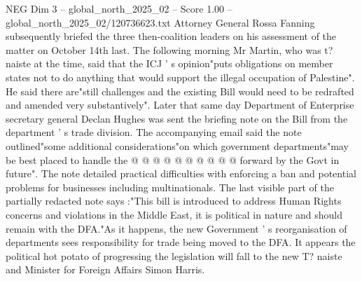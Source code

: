 \begin{textsample}{NEG Dim 3 – global\_north\_2025\_02 – Score 1.00 – global\_north\_2025\_02/120736623.txt}
Attorney General Rossa Fanning subsequently briefed the three then-coalition leaders on his assessment of the matter on October 14th last.
The following morning Mr Martin, who was t? naiste at the time, said that the ICJ ' s opinion"puts obligations on member states not to do anything that would support the illegal occupation of Palestine".
He said there are"still challenges and the existing Bill would need to be redrafted and amended very substantively".
Later that same day Department of Enterprise secretary general Declan Hughes was sent the briefing note on the Bill from the department ' s trade division.
The accompanying email said the note outlined"some additional considerations"on which government departments"may be best placed to handle the @ @ @ @ @ @ @ @ @ @ forward by the Govt in future".
The note detailed practical difficulties with enforcing a ban and potential problems for businesses including multinationals.
The last visible part of the partially redacted note says :"This bill is introduced to address Human Rights concerns and violations in the Middle East, it is political in nature and should remain with the DFA."As it happens, the new Government ' s reorganisation of departments sees responsibility for trade being moved to the DFA.
It appears the political hot potato of progressing the legislation will fall to the new T? naiste and Minister for Foreign Affairs Simon Harris.

\end{textsample}

